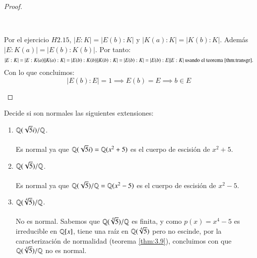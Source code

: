\begin{proof}
\begin{itemize}
        \begin{center}
            \\
        \end{center}

        Por el ejercicio $H2.15$, $|E:K| = |E(b):K|$ y $|K(a):K| = |K(b):K|$. Además $|E:K(a)| = |E(b):K(b)|$.
        Por tanto:
        $$
            |E:K| = |E:K(a)||K(a):K| = |E(b):K(b)||K(b):K| = |E(b):K| = |E(b):E||E:K| \text{ usando el teorema \ref{thm:transgr}.}
        $$
        Con lo que concluimos:
        $$
            |E(b):E| = 1 \implies E(b) = E \implies b\in E
        $$
    \end{itemize}
\end{proof}


\begin{ex}[H3.5]
    Decide si son normales las siguientes extensiones:
    \begin{enumerate}
        \item $\mathbb{Q}(\sqrt{5}i)/\mathbb{Q}$.\\\\

        Es normal ya que $\mathbb{Q}(\sqrt{5}i) = \mathbb{Q}(x^2+5)$ es el cuerpo de escisión de $x^2+5$.
        \item $\mathbb{Q}(\sqrt{5})/\mathbb{Q}$.\\\\

        Es normal ya que $\mathbb{Q}(\sqrt{5})/\mathbb{Q} = \mathbb{Q}(x^2-5)$ es el cuerpo de escisión de $x^2-5$.

        \item $\mathbb{Q}(\sqrt[4]{5})/\mathbb{Q}$.\\\\

        No es normal. Sabemos que $\mathbb{Q}(\sqrt[4]{5})/\mathbb{Q}$ es finita, y como $p(x) = x^4 - 5$ es irreducible en $\mathbb{Q}[x]$, tiene una raíz en $\mathbb{Q}(\sqrt[4]{5})$ pero no escinde, por la caracterización de normalidad (teorema \ref{thm:3.9}), concluimos con que $\mathbb{Q}(\sqrt[4]{5})/\mathbb{Q}$ no es normal.
    \end{enumerate}
\end{ex}

